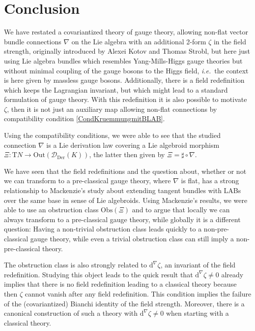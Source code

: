 \documentclass[preprint]{elsarticle}
\theoremstyle{plain}
\theoremstyle{remark}
\theoremstyle{definition}
\begin{document}
\section{Conclusion}

We have restated a covariantized theory of gauge theory, allowing non-flat vector bundle connections $\nabla$ on the Lie algebra with an additional 2-form $\zeta$ in the field strength, originally introduced by Alexei Kotov and Thomas Strobl, but here just using Lie algebra bundles which resembles Yang-Mills-Higgs gauge theories but without minimal coupling of the gauge bosons to the Higgs field, \textit{i.e.}~the context is here given by massless gauge bosons. Additionally, there is a field redefinition which keeps the Lagrangian invariant, but which might lead to a standard formulation of gauge theory. With this redefinition it is also possible to motivate $\zeta$, then it is not just an auxiliary map allowing non-flat connections by compatibility condition \eqref{CondKruemmungmitBLAB}.

Using the compatibility conditions, we were able to see that the studied connection $\nabla$ is a Lie derivation law covering a Lie algebroid morphism $\Xi: \mathrm{T}N \to \mathrm{Out}(\mathcal{D}_{\mathrm{Der}}(K))$, the latter then given by $\Xi = \sharp \circ \nabla$.

We have seen that the field redefinitions and the question about, whether or not we can transform to a pre-classical gauge theory, where $\nabla$ is flat, has a strong relationship to Mackenzie's study about extending tangent bundles with LABs over the same base in sense of Lie algebroids. Using Mackenzie's results, we were able to use an obstruction class $\mathrm{Obs}(\Xi)$ and to argue that locally we can always transform to a pre-classical gauge theory, while globally it is a different question: Having a non-trivial obstruction class leads quickly to a non-pre-classical gauge theory, while even a trivial obstruction class can still imply a non-pre-classical theory.

The obstruction class is also strongly related to $\mathrm{d}^\nabla \zeta$, an invariant of the field redefinition. Studying this object leads to the quick result that $\mathrm{d}^\nabla \zeta \neq 0$ already implies that there is no field redefinition leading to a classical theory because then $\zeta$ cannot vanish after any field redefinition. This condition implies the failure of the (covariantized) Bianchi identity of the field strength. Moreover, there is a canonical construction of such a theory with $\mathrm{d}^\nabla \zeta \neq 0$ when starting with a classical theory.
\end{document}
